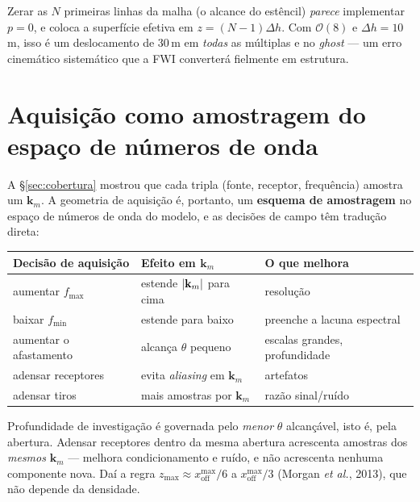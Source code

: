 \documentclass[11pt,a4paper,oneside]{report}
\begin{document}
\begin{armadilha}
Zerar as $N$ primeiras linhas da malha (o alcance do est\^encil) \emph{parece}
implementar $p=0$, e coloca a superf\'icie efetiva em $z=(N-1)\Delta h$. Com
$\mathcal{O}(8)$ e $\Delta h = 10$\,m, isso \'e um deslocamento de 30\,m em
\emph{todas} as m\'ultiplas e no \emph{ghost} --- um erro cinem\'atico
sistem\'atico que a FWI converter\'a fielmente em estrutura.
\end{armadilha}

\section{Aquisi\c{c}\~ao como amostragem do espa\c{c}o de n\'umeros de onda}

A §\ref{sec:cobertura} mostrou que cada tripla (fonte, receptor, frequ\^encia)
amostra um $\mathbf{k}_m$. A geometria de aquisi\c{c}\~ao \'e, portanto, um
\textbf{esquema de amostragem} no espa\c{c}o de n\'umeros de onda do modelo, e
as decis\~oes de campo t\^em tradu\c{c}\~ao direta:

\begin{center}
\begin{tabular}{@{}lll@{}}
\toprule
\textbf{Decis\~ao de aquisi\c{c}\~ao} & \textbf{Efeito em $\mathbf{k}_m$}
& \textbf{O que melhora} \\
\midrule
aumentar $f_{\max}$ & estende $\lvert \mathbf{k}_m \rvert$ para cima & resolu\c{c}\~ao \\
baixar $f_{\min}$ & estende para baixo & preenche a lacuna espectral \\
aumentar o afastamento & alcan\c{c}a $\theta$ pequeno & escalas grandes,
  profundidade \\
adensar receptores & evita \emph{aliasing} em $\mathbf{k}_m$ & artefatos \\
adensar tiros & mais amostras por $\mathbf{k}_m$ & raz\~ao sinal/ru\'ido \\
\bottomrule
\end{tabular}
\end{center}

\begin{teoria}
Profundidade de investiga\c{c}\~ao \'e governada pelo \emph{menor} $\theta$
alcan\c{c}\'avel, isto \'e, pela abertura. Adensar receptores dentro da mesma
abertura acrescenta amostras dos \emph{mesmos} $\mathbf{k}_m$ --- melhora
condicionamento e ru\'ido, e n\~ao acrescenta nenhuma componente nova. Da\'i a
regra $z_{\max}\approx x_{\text{off}}^{\max}/6$ a $x_{\text{off}}^{\max}/3$
(Morgan \emph{et al.}, 2013), que n\~ao depende da densidade.
\end{teoria}
\end{document}
